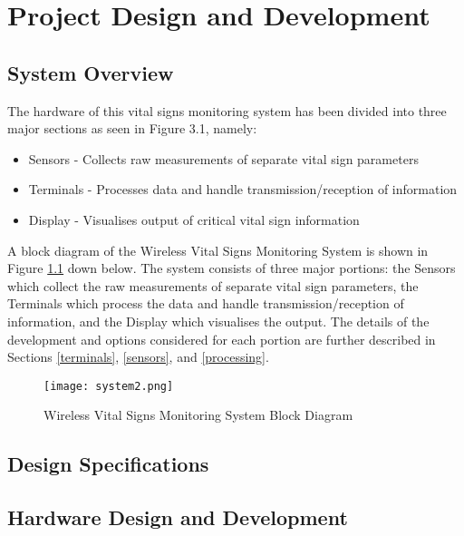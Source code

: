 \chapter{Project Design and Development}


\section{System Overview}

The hardware of this vital signs monitoring system has been divided into three major sections as seen in Figure 3.1, namely: 

\begin{itemize}
	\item Sensors - Collects raw measurements of separate vital sign parameters 
	\item Terminals - Processes data and handle transmission/reception of information
	\item Display - Visualises output of critical vital sign information
\end{itemize}

A block diagram of the Wireless Vital Signs Monitoring System is shown in Figure \ref{system} down below. The system consists of three major portions: the Sensors which collect the raw measurements of separate vital sign parameters, the Terminals which process the data and handle transmission/reception of information, and the Display which visualises the output. The details of the development and options considered for each portion are further described in Sections \ref{terminals}, \ref{sensors}, and \ref{processing}.

\begin{figure}[H]
	\centering
	\texttt{[image: system2.png]}
	\caption{Wireless Vital Signs Monitoring System Block Diagram}
	\label{system}
\end{figure}

\section{Design Specifications}
\label{specifications}

\section{Hardware Design and Development}







